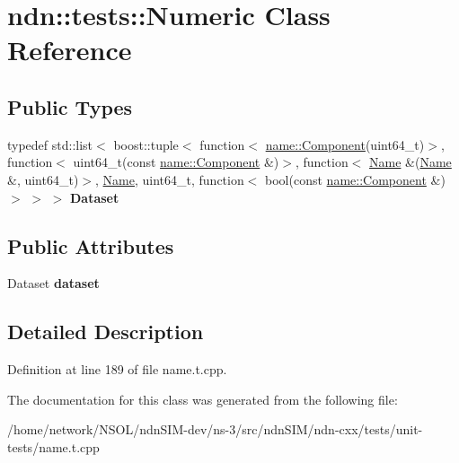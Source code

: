 \hypertarget{classndn_1_1tests_1_1Numeric}{}\section{ndn\+:\+:tests\+:\+:Numeric Class Reference}
\label{classndn_1_1tests_1_1Numeric}
\subsection*{Public Types}
\begin{DoxyCompactItemize}
\item 
typedef std\+::list$<$ boost\+::tuple$<$ function$<$ \hyperlink{classndn_1_1name_1_1Component}{name\+::\+Component}(uint64\+\_\+t)$>$, function$<$ uint64\+\_\+t(const \hyperlink{classndn_1_1name_1_1Component}{name\+::\+Component} \&)$>$, function$<$ \hyperlink{classndn_1_1Name}{Name} \&(\hyperlink{classndn_1_1Name}{Name} \&, uint64\+\_\+t)$>$, \hyperlink{classndn_1_1Name}{Name}, uint64\+\_\+t, function$<$ bool(const \hyperlink{classndn_1_1name_1_1Component}{name\+::\+Component} \&)$>$ $>$ $>$ {\bfseries Dataset}\hypertarget{classndn_1_1tests_1_1Numeric_a6706f0d7d77cdd5d551efd46d71f7d03}{}\label{classndn_1_1tests_1_1Numeric_a6706f0d7d77cdd5d551efd46d71f7d03}

\end{DoxyCompactItemize}
\subsection*{Public Attributes}
\begin{DoxyCompactItemize}
\item 
Dataset {\bfseries dataset}\hypertarget{classndn_1_1tests_1_1Numeric_a3fa0a91feef77230e1cf6113150030c5}{}\label{classndn_1_1tests_1_1Numeric_a3fa0a91feef77230e1cf6113150030c5}

\end{DoxyCompactItemize}


\subsection{Detailed Description}


Definition at line 189 of file name.\+t.\+cpp.



The documentation for this class was generated from the following file\+:\begin{DoxyCompactItemize}
\item 
/home/network/\+N\+S\+O\+L/ndn\+S\+I\+M-\/dev/ns-\/3/src/ndn\+S\+I\+M/ndn-\/cxx/tests/unit-\/tests/name.\+t.\+cpp\end{DoxyCompactItemize}
